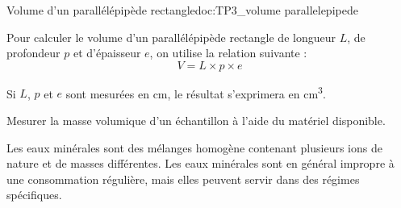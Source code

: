 \begin{doc}{Volume d'un parallélépipède rectangle}{doc:TP3_volume parallelepipede}
  \begin{multicols}{2}
    Pour calculer le volume d'un parallélépipède rectangle de longueur $L$, de profondeur $p$ et d’épaisseur $e$, on utilise la relation suivante :
    \begin{equation*}
      V = L \times p \times e
    \end{equation*}

    \centering
  \end{multicols}
  Si $L$, $p$ et $e$ sont mesurées en \unit{\cm},
  le résultat s’exprimera en \unit{\cubic\cm}.
\end{doc}

\mesure Mesurer la masse volumique d'un échantillon à l'aide du matériel disponible.




\begin{importants}
  Les eaux minérales sont des mélanges homogène contenant plusieurs ions de nature et de masses différentes.
  Les eaux minérales sont en général impropre à une consommation régulière, mais elles peuvent servir dans des régimes spécifiques.
  
\end{importants}



